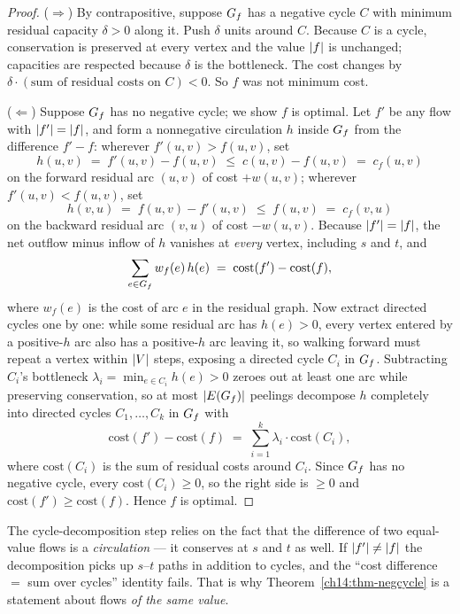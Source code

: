 \begin{proof}
($\Rightarrow$) By contrapositive, suppose $G_f$ has a negative cycle $C$ with minimum residual capacity $\delta>0$ along it. Push $\delta$ units around $C$. Because $C$ is a cycle, conservation is preserved at every vertex and the value $\lvert f\rvert$ is unchanged; capacities are respected because $\delta$ is the bottleneck. The cost changes by $\delta\cdot(\text{sum of residual costs on }C) < 0$. So $f$ was not minimum cost.

($\Leftarrow$) Suppose $G_f$ has no negative cycle; we show $f$ is optimal. Let $f'$ be any flow with $\lvert f'\rvert=\lvert f\rvert$, and form a nonnegative circulation $h$ inside $G_f$ from the difference $f'-f$: wherever $f'(u,v)>f(u,v)$, set
\[
  h(u,v) \;=\; f'(u,v)-f(u,v) \;\le\; c(u,v)-f(u,v) \;=\; c_f(u,v)
\]
on the forward residual arc $(u,v)$ of cost $+w(u,v)$; wherever $f'(u,v)<f(u,v)$, set
\[
  h(v,u) \;=\; f(u,v)-f'(u,v) \;\le\; f(u,v) \;=\; c_f(v,u)
\]
on the backward residual arc $(v,u)$ of cost $-w(u,v)$. Because $\lvert f'\rvert=\lvert f\rvert$, the net outflow minus inflow of $h$ vanishes at \emph{every} vertex, including $s$ and $t$, and
\[
  \sum_{e\in G_f} w_f(e)\,h(e) \;=\; \mathrm{cost}(f')-\mathrm{cost}(f),
\]
where $w_f(e)$ is the cost of arc $e$ in the residual graph. Now extract directed cycles one by one: while some residual arc has $h(e)>0$, every vertex entered by a positive-$h$ arc also has a positive-$h$ arc leaving it, so walking forward must repeat a vertex within $\lvert V\rvert$ steps, exposing a directed cycle $C_i$ in $G_f$. Subtracting $C_i$'s bottleneck $\lambda_i = \min_{e\in C_i} h(e) > 0$ zeroes out at least one arc while preserving conservation, so at most $\lvert E(G_f)\rvert$ peelings decompose $h$ completely into directed cycles $C_1,\dots,C_k$ in $G_f$ with
\[
  \mathrm{cost}(f') - \mathrm{cost}(f) \;=\; \sum_{i=1}^{k} \lambda_i \cdot \mathrm{cost}(C_i),
\]
where $\mathrm{cost}(C_i)$ is the sum of residual costs around $C_i$. Since $G_f$ has no negative cycle, every $\mathrm{cost}(C_i)\ge 0$, so the right side is $\ge 0$ and $\mathrm{cost}(f')\ge\mathrm{cost}(f)$. Hence $f$ is optimal.
\end{proof}

\begin{trapbox}
The cycle-decomposition step relies on the fact that the difference of two equal-value flows is a \emph{circulation} --- it conserves at $s$ and $t$ as well. If $\lvert f'\rvert\ne\lvert f\rvert$ the decomposition picks up $s$--$t$ paths in addition to cycles, and the ``cost difference $=$ sum over cycles'' identity fails. That is why Theorem~\ref{ch14:thm-negcycle} is a statement about flows \emph{of the same value}.
\end{trapbox}

